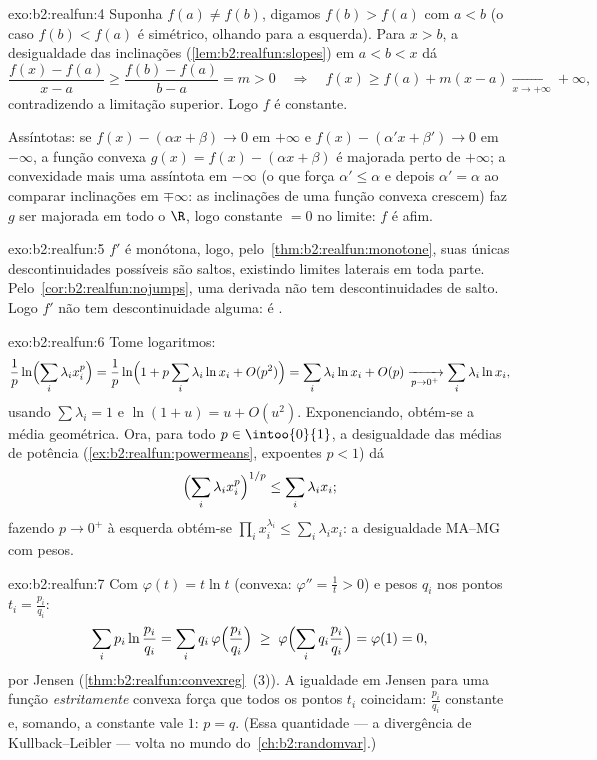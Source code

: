 \begin{solution}{exo:b2:realfun:4}
Suponha $f(a) \neq f(b)$, digamos $f(b) > f(a)$ com $a < b$ (o caso
$f(b) < f(a)$ é simétrico, olhando para a esquerda). Para $x > b$, a desigualdade
das inclinações (\cref{lem:b2:realfun:slopes}) em $a < b < x$ dá
\[
\frac{f(x) - f(a)}{x - a} \geq \frac{f(b) - f(a)}{b - a} = m > 0
\quad\Longrightarrow\quad
f(x) \geq f(a) + m(x - a) \xrightarrow[x\to+\infty]{} +\infty,
\]
contradizendo a limitação superior. Logo $f$ é constante.

Assíntotas: se $f(x) - (\alpha x + \beta) \to 0$ em $+\infty$ e
$f(x) - (\alpha' x + \beta') \to 0$ em $-\infty$, a função
convexa $g(x) = f(x) - (\alpha x + \beta)$ é majorada perto de
$+\infty$; a convexidade mais uma assíntota em $-\infty$ (o que força
$\alpha' \leq \alpha$ e depois $\alpha' = \alpha$ ao comparar inclinações em
$\mp\infty$: as inclinações de uma função convexa crescem) faz $g$
ser majorada em todo o $\R$, logo constante $= 0$ no limite: $f$
é afim.
\end{solution}

\begin{solution}{exo:b2:realfun:5}
$f'$ é monótona, logo, pelo~\cref{thm:b2:realfun:monotone}, suas únicas
descontinuidades possíveis são saltos, existindo limites laterais
em toda parte. Pelo~\cref{cor:b2:realfun:nojumps}, uma derivada não tem
descontinuidades de salto. Logo $f'$ não tem descontinuidade alguma:
é .
\end{solution}

\begin{solution}{exo:b2:realfun:6}
Tome logaritmos:
\[
\frac1p \ln\Bigl(\sum_i \lambda_i x_i^p\Bigr)
= \frac1p \ln\Bigl(1 + p\sum_i \lambda_i \ln x_i +
O(p^2)\Bigr)
= \sum_i \lambda_i \ln x_i + O(p)
\xrightarrow[p \to 0^+]{} \sum_i \lambda_i \ln x_i ,
\]
usando $\sum\lambda_i = 1$ e $\ln(1 + u) = u + O(u^2)$.
Exponenciando, obtém-se a média geométrica. Ora, para todo $p \in
\intoo{0}{1}$, a desigualdade das médias de potência
(\cref{ex:b2:realfun:powermeans}, expoentes $p < 1$) dá
\[
\Bigl(\sum_i \lambda_i x_i^p\Bigr)^{1/p} \leq \sum_i\lambda_i x_i ;
\]
fazendo $p \to 0^+$ à esquerda obtém-se $\prod_i x_i^{\lambda_i}
\leq \sum_i \lambda_i x_i$: a desigualdade MA--MG com pesos.
\end{solution}

\begin{solution}{exo:b2:realfun:7}
Com $\varphi(t) = t\ln t$ (convexa: $\varphi'' = \frac1t > 0$) e
pesos $q_i$ nos pontos $t_i = \frac{p_i}{q_i}$:
\[
\sum_i p_i \ln\frac{p_i}{q_i}
= \sum_i q_i\, \varphi\Bigl(\frac{p_i}{q_i}\Bigr)
\;\geq\; \varphi\Bigl(\sum_i q_i \frac{p_i}{q_i}\Bigr)
= \varphi(1) = 0 ,
\]
por Jensen (\cref{thm:b2:realfun:convexreg}~(3)). A igualdade em
Jensen para uma função \emph{estritamente} convexa força que todos os pontos
$t_i$ coincidam: $\frac{p_i}{q_i}$ constante e, somando, a
constante vale $1$: $p = q$. (Essa quantidade --- a divergência de
Kullback--Leibler --- volta no mundo do~\cref{ch:b2:randomvar}.)
\end{solution}

